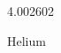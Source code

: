 \documentclass[12pt]{article}
\begin{document}
\hfill{}
\vfill
\begin{center}
  {\fontsize{50}{60}
  }

  \vspace{1em}

  4.002602

Helium
\end{center}
\vfill
\end{document}

